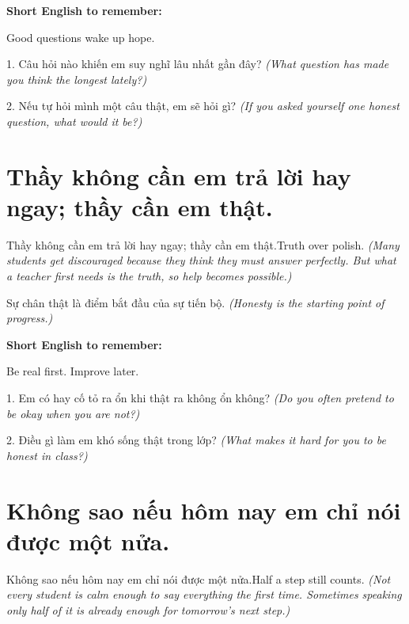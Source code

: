 \begin{ghinhoanh}
\textbf{Short English to remember:}

Good questions wake up hope.

\end{ghinhoanh}

\begin{tuhocnhanh}
1. Câu hỏi nào khiến em suy nghĩ lâu nhất gần đây? \textit{(What question has made you think the longest lately?)}

2. Nếu tự hỏi mình một câu thật, em sẽ hỏi gì? \textit{(If you asked yourself one honest question, what would it be?)}
\end{tuhocnhanh}
\ngancach


\section{Thầy không cần em trả lời hay ngay; thầy cần em thật.}
\begin{truyen}{Thầy không cần em trả lời hay ngay; thầy cần em thật.}{Truth over polish.}
\textit{(Many students get discouraged because they think they must answer perfectly. But what a teacher first needs is the truth, so help becomes possible.)}
\end{truyen}

\begin{baihoc}
Sự chân thật là điểm bắt đầu của sự tiến bộ.
\textit{(Honesty is the starting point of progress.)}
\end{baihoc}

\begin{ghinhoanh}
\textbf{Short English to remember:}

Be real first. Improve later.

\end{ghinhoanh}

\begin{tuhocnhanh}
1. Em có hay cố tỏ ra ổn khi thật ra không ổn không? \textit{(Do you often pretend to be okay when you are not?)}

2. Điều gì làm em khó sống thật trong lớp? \textit{(What makes it hard for you to be honest in class?)}
\end{tuhocnhanh}
\ngancach


\section{Không sao nếu hôm nay em chỉ nói được một nửa.}
\begin{truyen}{Không sao nếu hôm nay em chỉ nói được một nửa.}{Half a step still counts.}
\textit{(Not every student is calm enough to say everything the first time. Sometimes speaking only half of it is already enough for tomorrow's next step.)}
\end{truyen}

